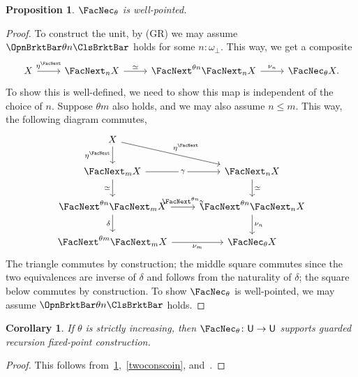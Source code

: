 \documentclass[a4paper,10pt]{amsart}
\newtheorem{corollary}{Corollary}[section]
\newtheorem{proposition}{Proposition}[section]
\theoremstyle{definition}
\newcommand{\ms}[1]{\mathsf{#1}}
\newcommand{\ass}[1]{\OpnBrktBar#1\ClsBrktBar}
\newcommand{\ovob}{\omega_\bot}
\newcommand{\bx}{\FacNec}
\newcommand{\Type}{\ms U}
\newcommand{\opm}[1]{\FacNext_{#1}}
\newcommand{\upm}[1]{\FacNext^{#1}}
\newcommand{\opmm}{\FacNext}
\begin{document}
\begin{proposition}\label{typewellpoint}
  $\bx_\theta$ is well-pointed.
\end{proposition}
\begin{proof}
  To construct the unit, by (GR) we may assume $\ass{\theta n}$ holds for some $n:\ovob$. This way, we get a composite
  \[ 
  \begin{tikzcd}
    X \ar[r, "\eta^{\opmm}"] & \opm nX \ar[r, "\simeq"] & \upm{\theta n} \opm nX \ar[r, "\nu_n"] & \bx_\theta X.
  \end{tikzcd}
  \]
  To show this is well-defined, we need to show this map is independent of the choice of $n$. Suppose $\theta m$ also holds, and we may also assume $n \le m$. This way, the following diagram commutes,
  \[\begin{tikzcd}
    X & \\
    {\opm mX} & {\opm nX} \\
    {\upm{\theta n}\opm mX} & {\upm{\theta n}\opm n X} \\
    {\upm{\theta m}\opm mX} & {\bx_\theta X}
    \arrow["{\eta^\opmm}"', from=1-1, to=2-1]
    \arrow["{\eta^\opmm}", from=1-1, to=2-2]
    \arrow["\gamma"{description}, from=2-1, to=2-2]
    \arrow["\simeq"', from=2-1, to=3-1]
    \arrow["\simeq", from=2-2, to=3-2]
    \arrow["{\upm{\theta n}\gamma}", from=3-1, to=3-2]
    \arrow["\delta"', from=3-1, to=4-1]
    \arrow["{\nu_n}", from=3-2, to=4-2]
    \arrow["{\nu_m}"', from=4-1, to=4-2]
  \end{tikzcd}\]
  The triangle commutes by construction; the middle square commutes since the two equivalences are inverse of $\delta$ and follows from the naturality of $\delta$; the square below commutes by construction. To show $\bx_\theta$ is well-pointed, we may assume $\ass{\theta n}$ holds.
\end{proof}

\begin{corollary}
  If $\theta$ is strictly increasing, then $\bx_\theta \colon \Type \to \Type$ supports guarded recursion fixed-point construction.
\end{corollary}
\begin{proof}
  This follows from~\cref{typewellpoint},~\cref{twoconscoin}, and~\cite{RN839}.
\end{proof}
\end{document}
